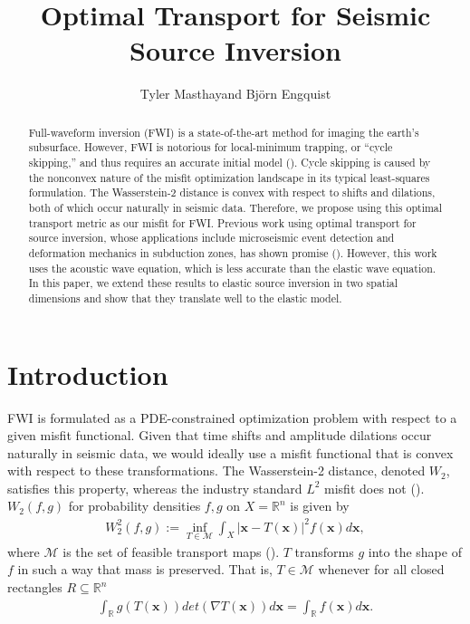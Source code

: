 \documentclass[paper,onecolumn,twoside]{geophysics}
\newcommand{\citensp}[1]{\hspace{1sp}\cite{#1}}
\newcommand{\bs}[1]{\boldsymbol{#1}}
\newcommand{\R}{\mathbb{R}}
\begin{document}
\title{Optimal Transport for Seismic Source Inversion}

\renewcommand{\thefootnote}{\fnsymbol{footnote}} 

\address{
\footnotemark[1] Oden Institute, 
The University of Texas at Austin}
\author{Tyler Masthay\footnotemark[1] and Bj\"{o}rn Engquist\footnotemark[1]}



\begin{abstract}
Full-waveform inversion (FWI) is a state-of-the-art method for imaging the earth's subsurface. However, FWI is notorious for local-minimum trapping, or ``cycle skipping,'' and thus requires an accurate initial model (\citensp{metivier2018optimal}).
Cycle skipping is caused by the nonconvex nature of the misfit optimization landscape in its typical least-squares formulation.
The Wasserstein-2 distance is convex with respect to shifts and dilations, both of which occur naturally in seismic data. Therefore, we propose using this optimal transport metric as our misfit for FWI. 
Previous work using optimal transport for source inversion, whose applications include microseismic event detection and deformation mechanics in subduction zones, has shown promise (\citensp{chen2018quadratic}). However, this work uses the acoustic wave equation, which is less accurate than the elastic wave equation.
In this paper, we extend these results to elastic source inversion in two spatial dimensions and show that they translate well to the elastic model.
\end{abstract}

\section{Introduction}
FWI is formulated as a PDE-constrained optimization problem with respect to a given misfit functional. Given that time shifts and amplitude dilations occur naturally in seismic data, we would ideally use a misfit functional that is convex with respect to these transformations. The Wasserstein-2 distance, denoted $W_2$, satisfies this property, whereas the industry standard $L^2$ misfit does not (\citensp{yang2018analysis}). 
$W_2(f,g)$ for probability densities $f,g$ on $X=\mathbb{R}^{n}$ is given by
\begin{align} \label{eqn:w2}
    W_2^2(f,g) := \inf_{T \in \mathcal{M}} \int_{X} |\bs{x} - T(\bs{x})|^2 f(\bs{x}) d\bs{x},
\end{align}
where $\mathcal{M}$ is the set of feasible transport maps (\citensp{villani2021topics}). $T$ transforms $g$ into the shape of $f$ in such a way that mass is preserved. That is, $T \in \mathcal{M}$ whenever for all closed rectangles $R \subseteq \mathbb{R}^{n}$
\begin{align*}
    \int_{\R} g(T(\bs{x})) det(\nabla T(\bs{x})) d\bs{x} = \int_{\R} f(\bs{x}) d\bs{x}.
\end{align*}
\end{document}
